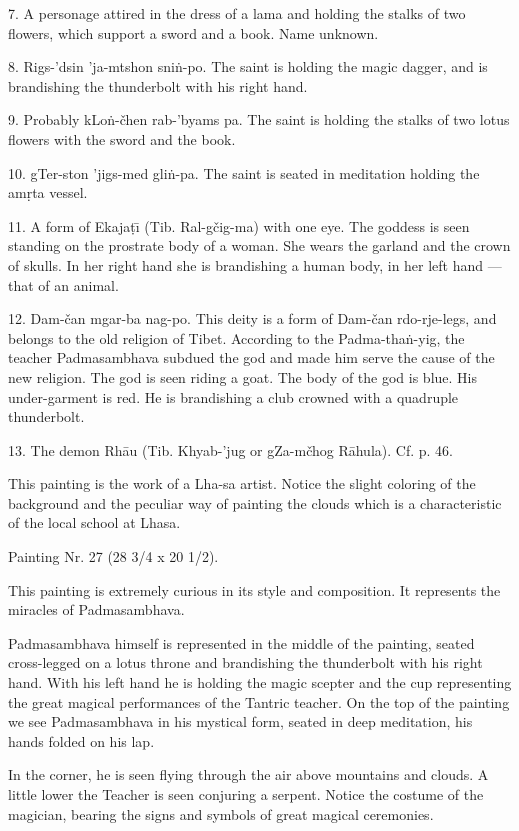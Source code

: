 \documentclass[a4paper, 12pt, oneside]{article}
\begin{document}
7. A personage attired in the dress of a lama and holding the stalks of two flowers, which support a sword and a book. Name unknown.

8. Rigs-'dsin 'ja-mtshon sni\.{n}-po. The saint is holding the magic dagger, and is brandishing the thunderbolt with his right hand.

9. Probably kLo\.{n}-čhen rab-'byams pa. The saint is holding the stalks of two lotus flowers with the sword and the book.

10. gTer-ston 'jigs-med gli\.{n}-pa. The saint is seated in meditation holding the am\d{r}ta vessel.

11. A form of Ekaja\d{t}\={\i} (Tib. Ral-gčig-ma) with one eye. The goddess is seen standing on the prostrate body of a woman. She wears the garland and the crown of skulls. In her right hand she is brandishing a human body, in her left hand --- that of an animal.

12. Dam-čan mgar-ba nag-po. This deity is a form of Dam-čan rdo-rje-legs, and belongs to the old religion of Tibet. According to the Padma-tha\.{n}-yig, the teacher Padmasambhava subdued the god and made him serve the cause of the new religion. The god is seen riding a goat. The body of the god is blue. His under-garment is red. He is brandishing a club crowned with a quadruple thunderbolt.

13. The demon Rh\={a}u (Tib. Khyab-'jug or gZa-mčhog R\={a}hula). Cf. p. 46.

This painting is the work of a Lha-sa artist. Notice the slight coloring of the background and the peculiar way of painting the clouds which is a characteristic of the local school at Lhasa.

\bigskip

Painting Nr. 27 (28 3/4 x 20 1/2).

\bigskip

This painting is extremely curious in its style and composition. It represents the miracles of Padmasambhava.

Padmasambhava himself is represented in the middle of the painting, seated cross-legged on a lotus throne and brandishing the thunderbolt with his right hand. With his left hand he is holding the magic scepter and the cup representing the great magical performances of the Tantric teacher. On the top of the painting we see Padmasambhava in his mystical form, seated in deep meditation, his hands folded on his lap.

In the corner, he is seen flying through the air above mountains and clouds. A little lower the Teacher is seen conjuring a serpent. Notice the costume of the magician, bearing the signs and symbols of great magical ceremonies.
\end{document}
